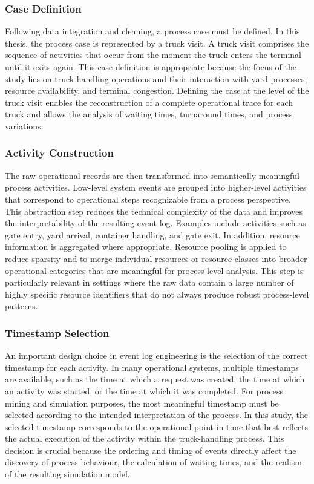 \subsubsection{Case Definition}

Following data integration and cleaning, a process case must be defined. In this thesis, the process case is represented by a truck visit. A truck visit comprises the sequence of activities that occur from the moment the truck enters the terminal until it exits again. This case definition is appropriate because the focus of the study lies on truck-handling operations and their interaction with yard processes, resource availability, and terminal congestion. Defining the case at the level of the truck visit enables the reconstruction of a complete operational trace for each truck and allows the analysis of waiting times, turnaround times, and process variations.

\subsubsection{Activity Construction}

The raw operational records are then transformed into semantically meaningful process activities. Low-level system events are grouped into higher-level activities that correspond to operational steps recognizable from a process perspective. This abstraction step reduces the technical complexity of the data and improves the interpretability of the resulting event log. Examples include activities such as gate entry, yard arrival, container handling, and gate exit. In addition, resource information is aggregated where appropriate. Resource pooling is applied to reduce sparsity and to merge individual resources or resource classes into broader operational categories that are meaningful for process-level analysis. This step is particularly relevant in settings where the raw data contain a large number of highly specific resource identifiers that do not always produce robust process-level patterns.

\subsubsection{Timestamp Selection}

An important design choice in event log engineering is the selection of the correct timestamp for each activity. In many operational systems, multiple timestamps are available, such as the time at which a request was created, the time at which an activity was started, or the time at which it was completed. For process mining and simulation purposes, the most meaningful timestamp must be selected according to the intended interpretation of the process. In this study, the selected timestamp corresponds to the operational point in time that best reflects the actual execution of the activity within the truck-handling process. This decision is crucial because the ordering and timing of events directly affect the discovery of process behaviour, the calculation of waiting times, and the realism of the resulting simulation model.

